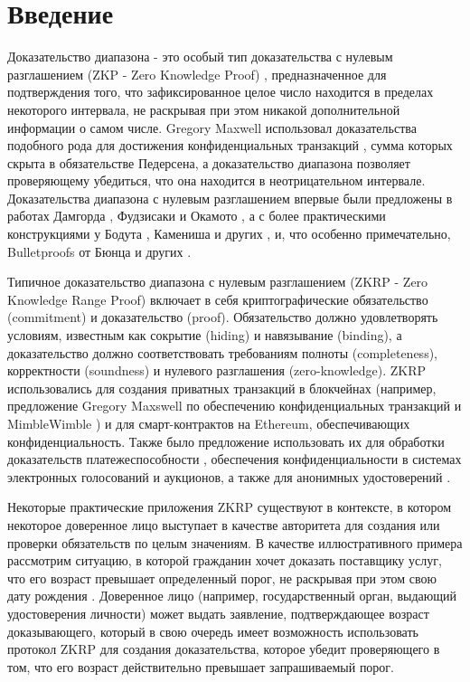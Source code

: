 \chapter{Введение}
Доказательство диапазона - это особый тип доказательства с нулевым разглашением (ZKP - Zero Knowledge Proof) \cite{10.1145/22145.22178}, предназначенное для подтверждения того, что зафиксированное целое число находится в пределах некоторого интервала, не раскрывая при этом никакой дополнительной информации о самом числе.
Gregory Maxwell использовал доказательства подобного рода для достижения конфиденциальных транзакций \cite{maxwell2016first}, сумма которых скрыта в обязательстве Педерсена, а доказательство диапазона позволяет проверяющему убедиться, что она находится в неотрицательном интервале.
Доказательства диапазона с нулевым разглашением впервые были предложены в работах Дамгорда \cite{eurocrypt-1993-2249}, Фудзисаки и Окамото \cite{10.5555/646762.706160}, а с более практическими конструкциями у Бодута \cite{10.1007/3-540-45539-6_31}, Камениша и других \cite{10.1007/978-3-540-89255-7_15}, и, что особенно примечательно, Bulletproofs от Бюнца и других \cite{8418611}.

Типичное доказательство диапазона с нулевым разглашением (ZKRP - Zero Knowledge Range Proof) включает в себя криптографические обязательство (commitment) и доказательство (proof).
Обязательство должно удовлетворять условиям, известным как сокрытие (hiding) и навязывание (binding), а доказательство должно соответствовать требованиям полноты (completeness), корректности (soundness) и нулевого разглашения (zero-knowledge).
ZKRP использовались для создания приватных транзакций в блокчейнах (например, предложение Gregory Maxswell по обеспечению конфиденциальных транзакций \cite{maxwell2016first} и MimbleWimble \cite{poelstra2016mimblewimble}) и для смарт-контрактов на Ethereum, обеспечивающих конфиденциальность.
Также было предложение использовать их для обработки доказательств платежеспособности \cite{cryptoeprint:2020/468, 10.1145/2810103.2813674}, обеспечения конфиденциальности в системах электронных голосований и аукционов, а также для анонимных удостоверений \cite{morais2019survey}.

Некоторые практические приложения ZKRP существуют в контексте, в котором некоторое доверенное лицо выступает в качестве авторитета для создания или проверки обязательств по целым значениям.
В качестве иллюстративного примера рассмотрим ситуацию, в которой гражданин хочет доказать поставщику услуг, что его возраст превышает определенный порог, не раскрывая при этом свою дату рождения \cite{asecuritysite_11123, shah2017zeroknowledge}.
Доверенное лицо (например, государственный орган, выдающий удостоверения личности) может выдать заявление, подтверждающее возраст доказывающего, который в свою очередь имеет возможность использовать протокол ZKRP для создания доказательства, которое убедит проверяющего в том, что его возраст действительно превышает запрашиваемый порог.

